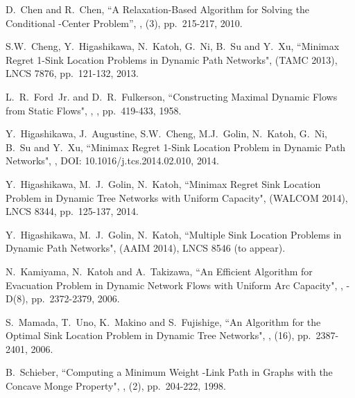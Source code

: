 \documentclass[a4paper]{llncs}
\begin{document}
\begin{thebibliography}{99}
		D.~Chen and R.~Chen, 
		\newblock ``A Relaxation-Based Algorithm for Solving the Conditional -Center Problem'', 
		,
		(3), pp.~215-217, 2010.

		S.W.~Cheng, Y.~Higashikawa, N.~Katoh, G.~Ni, B.~Su and Y.~Xu,
		\newblock ``Minimax Regret 1-Sink Location Problems in Dynamic Path Networks",
		 (TAMC 2013),
		\newblock LNCS 7876, pp.~121-132, 2013.

		L.~R.~Ford~Jr. and D.~R.~Fulkerson,
		\newblock ``Constructing Maximal Dynamic Flows from Static Flows",
		,
		, pp.~419-433, 1958.	
			
		Y.~Higashikawa, J.~Augustine, S.W.~Cheng, M.J.~Golin, N.~Katoh, G.~Ni, B.~Su and Y.~Xu,
		\newblock ``Minimax Regret 1-Sink Location Problem in Dynamic Path Networks",
		,
		\newblock DOI: 10.1016/j.tcs.2014.02.010, 2014.		
	
		Y.~Higashikawa, M.~J.~Golin, N.~Katoh,
		\newblock ``Minimax Regret Sink Location Problem in Dynamic Tree Networks with Uniform Capacity",
		 (WALCOM 2014),
		\newblock LNCS 8344, pp.~125-137, 2014.
	
		Y.~Higashikawa, M.~J.~Golin, N.~Katoh,
		\newblock ``Multiple Sink Location Problems in Dynamic Path Networks",
		 (AAIM 2014),
		\newblock LNCS 8546 (to appear).	
					
		N.~Kamiyama, N.~Katoh and A.~Takizawa, 
		\newblock ``An Efficient Algorithm for Evacuation Problem in Dynamic Network Flows with Uniform Arc Capacity",
		,
		-D(8), pp.~2372-2379, 2006. 
	
		S.~Mamada, T.~Uno, K.~Makino and S.~Fujishige,
		\newblock ``An  Algorithm for the Optimal Sink Location Problem in Dynamic Tree Networks",
		,
		(16), pp.~2387-2401, 2006. 
		
		B.~Schieber,
		\newblock ``Computing a Minimum Weight -Link Path in Graphs with the Concave Monge Property",
		,
		(2), pp.~204-222, 1998. 		
		 
\end{thebibliography}
\end{document}
